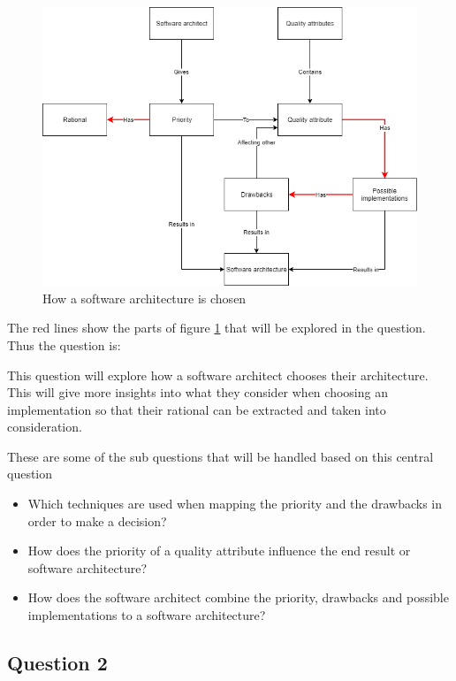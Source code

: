 \begin{figure}[H]
	\includegraphics[width=\linewidth]{creating_architecture.png}
        \caption{How a software architecture is chosen}
        \label{fig:ChooseSoftwareArchitecture}
\end{figure}

The red lines show the parts of figure \ref{fig:ChooseSoftwareArchitecture} that will be explored in the question. Thus the question is:


This question will explore how a software architect chooses their architecture. This will give more insights into what they consider when choosing an implementation so that their rational can be extracted and taken into consideration.

These are some of the sub questions that will be handled based on this central question
\begin{itemize}
	\item Which techniques are used when mapping the priority and the drawbacks in order to make a decision?
	\item How does the priority of a quality attribute influence the end result or software architecture?
	\item How does the software architect combine the priority, drawbacks and possible implementations to a software architecture?
\end{itemize}

\subsection{Question 2}
\label{sec:Question2}

